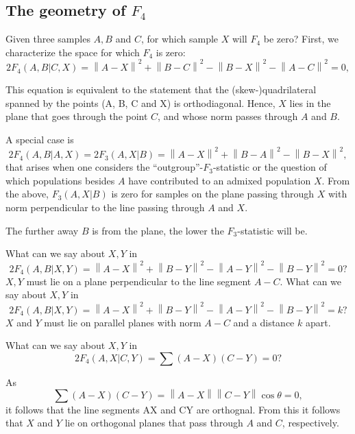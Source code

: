 \documentclass[9pt,twocolumn,twoside,lineno]{pnas-new}
\newcommand{\norm}[1]{\left\lVert #1 \right\rVert}
\newcommand{\nsq}[1]{\left\lVert #1 \right\rVert^2}
\begin{document}
\subsection*{The geometry of $F_4$}
Given three samples $A, B$ and $C$, for which sample $X$ will $F_4$ be zero?
First, we characterize the space for which $F_4$ is zero:
\begin{equation}
    2 F_4(A, B | C, X) = \nsq{A-X} + \nsq{B-C} - \nsq{B-X} - \nsq{A-C} = 0,
\end{equation}

This equation is equivalent to the statement that the (skew-)quadrilateral spanned by the points (A, B, C and X) is orthodiagonal. Hence, $X$ lies in the plane that goes through the point $C$, and whose norm passes through $A$ and $B$. 

A special case is 
\begin{equation}
    2 F_4(A, B | A, X) =2 F_3(A, X | B) = \nsq{A-X} + \nsq{B-A} - \nsq{B-X},
\end{equation}
that arises when one considers the ``outgroup''-$F_3$-statistic or the question of which populations besides $A$ have contributed to an admixed population $X$. From the above, $F_3(A, X|B)$ is zero for samples on the plane passing through $X$ with norm perpendicular to the line passing through $A$ and $X$.

The further away $B$ is from the plane, the lower the $F_3$-statistic will be.

What can we say about $X, Y$ in
\begin{equation}
    2 F_4(A, B | X, Y) = \nsq{A-X} + \nsq{B-Y} - \nsq{A-Y} - \nsq{B-Y} = 0
    \text{?}
\end{equation}
$X, Y$ must lie on a plane perpendicular to the line segment $A-C$. 
What can we say about $X, Y$ in
\begin{equation}
    2 F_4(A, B | X, Y) = \nsq{A-X} + \nsq{B-Y} - \nsq{A-Y} - \nsq{B-Y} = k
    \text{?}
    \end{equation}
$X$ and $Y$ must lie on parallel planes with norm $A-C$ and a distance $k$ apart.

What can we say about $X, Y$ in
\begin{equation}
    2 F_4(A, X | C, Y) = \sum (A-X)(C-Y) = 0
    \text{?}
\end{equation}

As $$\sum(A-X)(C-Y) = \norm{A-X}\norm{C-Y}\cos{\theta} = 0,$$
it follows that the line segments AX and CY are orthognal. From this it follows that $X$ and $Y$ lie on orthogonal planes that pass through $A$ and $C$, respectively.
\end{document}
